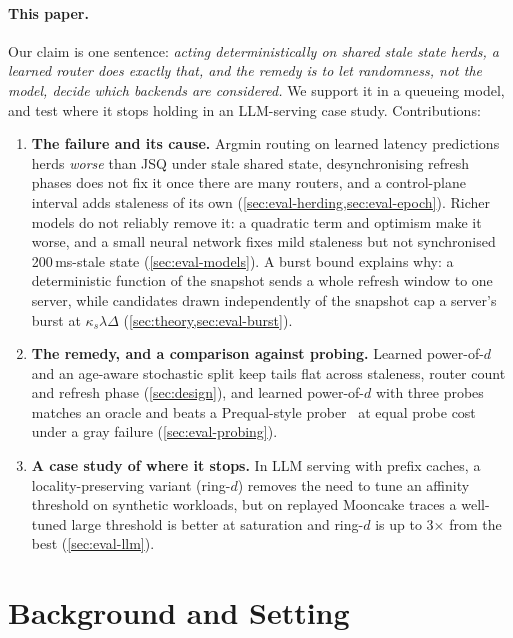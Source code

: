 \documentclass[10pt,twocolumn,letterpaper]{article}
\newif\ifrealsys\realsysfalse %
\begin{document}
\paragraph{This paper.} Our claim is one sentence: \emph{acting deterministically on shared stale state herds, a learned
router does exactly that, and the remedy is to let randomness, not the model, decide which backends are considered.} We
support it in a queueing model, and test where it stops holding in an LLM-serving case study\ifrealsys{} and on a
multi-process prototype\fi. Contributions:
\begin{enumerate}
\item \textbf{The failure and its cause.} Argmin routing on learned latency predictions herds \emph{worse} than JSQ under stale shared
  state, desynchronising refresh phases does not fix it once there are many routers, and a control-plane interval adds staleness of its own
  (\cref{sec:eval-herding,sec:eval-epoch}). Richer models do not reliably remove it: a quadratic term and optimism make it worse, and a small neural network fixes mild staleness but not
  synchronised 200\,ms-stale state (\cref{sec:eval-models}). A burst bound explains why: a deterministic function of the snapshot sends a whole refresh window to one
  server, while candidates drawn independently of the snapshot cap a server's burst at $\kappa_s\lambda\Delta$
  (\cref{sec:theory,sec:eval-burst}).
\item \textbf{The remedy, and a comparison against probing.} Learned power-of-$d$ and an age-aware stochastic split keep tails flat across staleness,
  router count and refresh phase (\cref{sec:design}), and learned power-of-$d$ with three probes matches an oracle and beats a Prequal-style
  prober~\citep{prequal2024} at equal probe cost under a gray failure (\cref{sec:eval-probing}).
\item \textbf{A case study of where it stops.} In LLM serving with prefix caches, a locality-preserving variant (ring-$d$) removes the need to tune an
  affinity threshold on synthetic workloads, but on replayed Mooncake traces a well-tuned large threshold is better at saturation and
  ring-$d$ is up to 3$\times$ from the best (\cref{sec:eval-llm}).
\end{enumerate}

\section{Background and Setting}
\label{sec:background}
\end{document}
